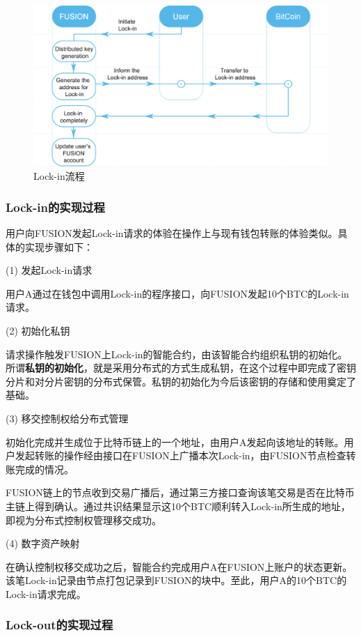 \documentclass[a4paper,12pt]{article}
\begin{document}
\begin{figure}[htbp]
\centering\includegraphics[width=5in]{pic/lockin.png}
\caption{Lock-in流程}\label{fig:1}
\end{figure}

\subsubsection{Lock-in的实现过程}

用户向FUSION发起Lock-in请求的体验在操作上与现有钱包转账的体验类似。具体的实现步骤如下：

(1) 发起Lock-in请求

用户A通过在钱包中调用Lock-in的程序接口，向FUSION发起10个BTC的Lock-in请求。

(2) 初始化私钥

请求操作触发FUSION上Lock-in的智能合约，由该智能合约组织私钥的初始化。所谓{\bfseries{私钥的初始化}}，就是采用分布式的方式生成私钥，在这个过程中即完成了密钥分片和对分片密钥的分布式保管。私钥的初始化为今后该密钥的存储和使用奠定了基础。

(3) 移交控制权给分布式管理

初始化完成并生成位于比特币链上的一个地址，由用户A发起向该地址的转账。用户发起转账的操作经由接口在FUSION上广播本次Lock-in，由FUSION节点检查转账完成的情况。

FUSION链上的节点收到交易广播后，通过第三方接口查询该笔交易是否在比特币主链上得到确认。通过共识结果显示这10个BTC顺利转入Lock-in所生成的地址，即视为分布式控制权管理移交成功。

(4) 数字资产映射

在确认控制权移交成功之后，智能合约完成用户A在FUSION上账户的状态更新。该笔Lock-in记录由节点打包记录到FUSION的块中。至此，用户A的10个BTC的Lock-in请求完成。

\subsubsection{Lock-out的实现过程}
\end{document}

